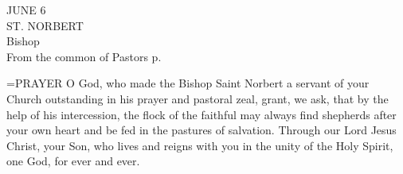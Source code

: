 \begin{center}\normalsize JUNE 6\\
\footnotesize ST. NORBERT\\
\footnotesize Bishop\\
\footnotesize From the common of Pastors p. \\
\end{center}

\hangindent=\parindent \small{PRAYER 
O God, who made the Bishop Saint Norbert
a servant of your Church
outstanding in his prayer and pastoral zeal,
grant, we ask, that by the help of his intercession,
the flock of the faithful
may always find shepherds after your own heart
and be fed in the pastures of salvation.
Through our Lord Jesus Christ, your Son,
who lives and reigns with you in the unity of the Holy Spirit,
one God, for ever and ever.\\}
 
